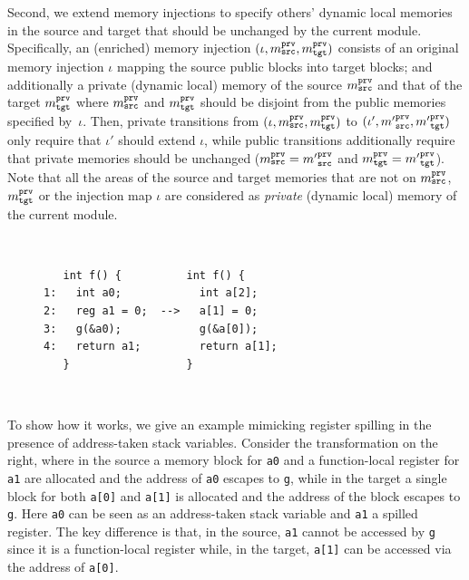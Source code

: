 {Second, we extend memory injections to specify others' dynamic local
memories in the source and target that should be unchanged by the current module.
Specifically, an (enriched) memory injection $(\iota, m^{\texttt{prv}}_{\texttt{src}}, m^{\texttt{prv}}_{\texttt{tgt}})$
consists of an original memory injection $\iota$ mapping the source public blocks into target blocks; and additionally
a private (\ie dynamic local) memory of the source $m^{\texttt{prv}}_{\texttt{src}}$ and that of the target $m^{\texttt{prv}}_{\texttt{tgt}}$
where $m^{\texttt{prv}}_{\texttt{src}}$ and $m^{\texttt{prv}}_{\texttt{tgt}}$ should be disjoint from the public memories specified by~$\iota$.
Then, private transitions from $(\iota, m^{\texttt{prv}}_{\texttt{src}}, m^{\texttt{prv}}_{\texttt{tgt}})$ to
$(\iota', {m'}^{\texttt{prv}}_{\texttt{src}}, {m'}^{\texttt{prv}}_{\texttt{tgt}})$ only require that $\iota'$ should extend $\iota$,
while public transitions additionally require that private memories should be unchanged
(\ie $m^{\texttt{prv}}_{\texttt{src}} = {m'}^{\texttt{prv}}_{\texttt{src}}$ and $m^{\texttt{prv}}_{\texttt{tgt}} = {m'}^{\texttt{prv}}_{\texttt{tgt}}$).
Note that all the areas of the source and target memories that are not on $m^{\texttt{prv}}_{\texttt{src}}$, $m^{\texttt{prv}}_{\texttt{tgt}}$ or the injection map $\iota$
are considered as \emph{private} (\ie dynamic local) memory of the current module.

\begin{figure}
\begin{minipage}{0.45\textwidth}
\mbox{}\\[-7mm]    
\begin{Verbatim}
   int f() {          int f() {     
1:   int a0;            int a[2];   
2:   reg a1 = 0;  -->   a[1] = 0;   
3:   g(&a0);            g(&a[0]);   
4:   return a1;         return a[1];
   }                  }
\end{Verbatim}
\mbox{}\\[-10mm]
\end{minipage}
\end{figure}
To show how it works,
we give an example mimicking register spilling
in the presence of address-taken stack variables.
Consider the transformation on the right, where
in the source a memory block for \texttt{a0} and a function-local register for \texttt{a1} are allocated and
the address of \texttt{a0} escapes to \texttt{g},
while in the target a single block for both \texttt{a[0]} and \texttt{a[1]}
is allocated and the address of the block escapes to \texttt{g}.
Here \texttt{a0} can be seen as an address-taken stack variable and \texttt{a1} a spilled register.
The key difference is that, in the source, \texttt{a1} cannot be accessed by
\texttt{g} since it is a function-local register
while, in the target, \texttt{a[1]} can be accessed via the address of \texttt{a[0]}.

}

